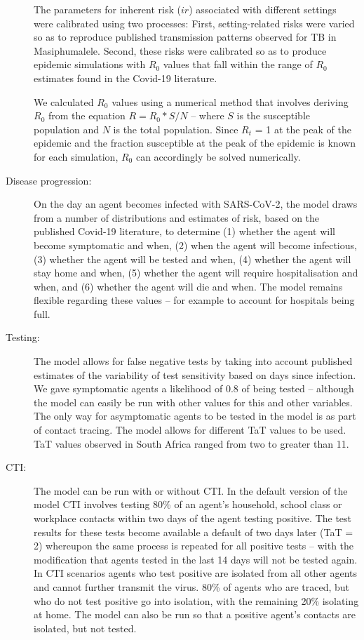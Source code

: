 \documentclass{article}
\begin{document}
\begin{description}
  The parameters for inherent risk ($ir$) associated with different settings
  were calibrated using two processes: First, setting-related risks were varied
  so as to reproduce published transmission patterns observed for TB in
  Masiphumalele.\cite{Andrews2014} Second, these risks were calibrated so as to
  produce epidemic simulations with $R_0$ values that fall within the range of
  $R_0$ estimates found in the Covid-19 literature.\cite{Hellewell2020}

  We calculated $R_0$ values using a numerical method that involves deriving
  $R_0$ from the equation $R = R_0 * S/N$ – where $S$ is the susceptible
  population and $N$ is the total population.\cite{Vynnycky2010} Since
  $R_t$ = 1 at the peak of the epidemic and the fraction susceptible at the peak
  of the epidemic is known for each simulation, $R_0$ can accordingly be solved
  numerically.

\item[Disease progression:] On the day an agent becomes infected with
  SARS-CoV-2, the model draws from a number of distributions and estimates of
  risk, based on the published Covid-19 literature,\cite{Verity2020, SACMC2020}
  to determine (1) whether the agent will become symptomatic and when, (2) when
  the agent will become infectious, (3) whether the agent will be tested and
  when, (4) whether the agent will stay home and when, (5) whether the agent
  will require hospitalisation and when, and (6) whether the agent will die and
  when. The model remains flexible regarding these values – for example to
  account for hospitals being full.

\item[Testing:] The model allows for false negative tests by taking into account
  published estimates of the variability of test sensitivity based on days since
  infection. \cite{Kucirka2020} We gave symptomatic agents a likelihood of 0.8
  of being tested – although the model can easily be run with other values for
  this and other variables. The only way for asymptomatic agents to be tested in
  the model is as part of contact tracing. The model allows for different TaT
  values to be used. TaT values observed in South Africa ranged from two to
  greater than 11. \cite{NICD2020}

\item[CTI:] The model can be run with or without CTI. In the default version of
  the model CTI involves testing 80\% of an agent’s household, school class or
  workplace contacts within two days of the agent testing positive. The test
  results for these tests become available a default of two days later (TaT = 2)
  whereupon the same process is repeated for all positive tests – with the
  modification that agents tested in the last 14 days will not be tested
  again. In CTI scenarios agents who test positive are isolated from all other
  agents and cannot further transmit the virus. 80\% of agents who are traced,
  but who do not test positive go into isolation, with the remaining 20\%
  isolating at home. The model can also be run so that a positive agent’s
  contacts are isolated, but not tested.


\end{description}
\end{document}
